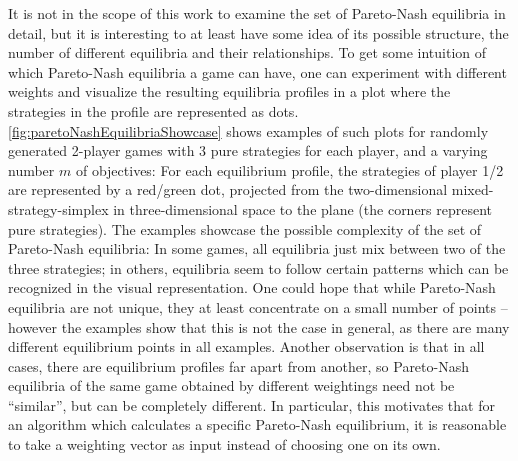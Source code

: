 \documentclass[a4paper]{scrreprt}
\theoremstyle{definition}
\begin{document}
    It is not in the scope of this work to examine the set of Pareto-Nash equilibria in detail, but it is interesting to at least have some idea of its possible structure, 
    the number of different equilibria and their relationships.
    To get some intuition of which Pareto-Nash equilibria a game can have, one can experiment with different weights and visualize the resulting equilibria profiles in a plot where the strategies in the profile are represented as dots.
    \autoref{fig:paretoNashEquilibriaShowcase} %
    shows examples of such plots for randomly generated 2-player games with 3 pure strategies for each player, and a varying number $m$ of objectives: For each equilibrium profile, the strategies of player 1/2 are represented by a red/green dot, projected from the two-dimensional mixed-strategy-simplex in three-dimensional space to the plane 
    (the corners represent pure strategies).
    The examples showcase the possible complexity of the set of Pareto-Nash equilibria:
    In some games, all equilibria just mix between two of the three strategies; in others, equilibria seem to follow certain patterns which can be recognized in the visual representation.
    One could hope that while Pareto-Nash equilibria are not unique, they at least concentrate on a small number of points -- however the examples show that this is not the case in general, as there are many different equilibrium points in all examples.
    Another observation is that in all cases, there are equilibrium profiles far apart from another, so Pareto-Nash equilibria of the same game obtained by different weightings need not be “similar”, but can be completely different.
    In particular, this motivates that for an algorithm which calculates a specific Pareto-Nash equilibrium, it is reasonable to take a weighting vector as input instead of choosing one on its own.
\end{document}
